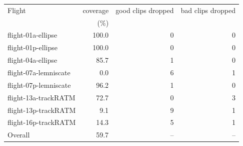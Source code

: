 \begin{tabular}{lrrr}
\toprule
Flight & coverage & good clips dropped & bad clips dropped \\
 & (\%) & & \\
\midrule
flight-01a-ellipse & 100.0 & 0 & 0 \\
flight-01p-ellipse & 100.0 & 0 & 0 \\
flight-04a-ellipse & 85.7 & 1 & 0 \\
flight-07a-lemniscate & 0.0 & 6 & 1 \\
flight-07p-lemniscate & 96.2 & 1 & 0 \\
flight-13a-trackRATM & 72.7 & 0 & 3 \\
flight-13p-trackRATM & 9.1 & 9 & 1 \\
flight-16p-trackRATM & 14.3 & 5 & 1 \\
\midrule
Overall & 59.7 & -- & -- \\
\bottomrule
\end{tabular}
